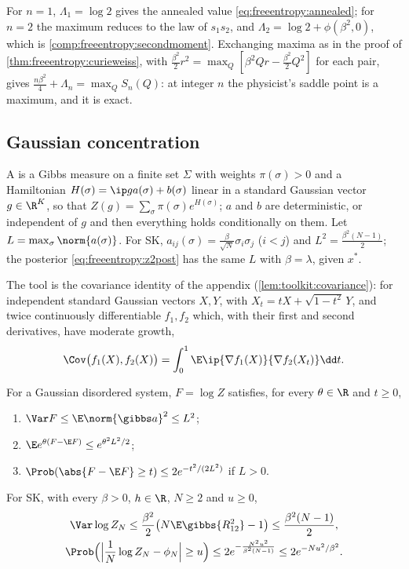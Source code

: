 \begin{refsection}
For $n=1$, $\Lambda_1=\log2$ gives the annealed value \eqref{eq:freeentropy:annealed}; for $n=2$ the maximum reduces to the law of $s_1s_2$, and $\Lambda_2=\log2+\phi(\beta^2,0)$, which is \cref{comp:freeentropy:secondmoment}. Exchanging maxima as in the proof of \cref{thm:freeentropy:curieweiss}, with $\frac{\beta^2}2r^2=\max_Q[\beta^2Qr-\frac{\beta^2}2Q^2]$ for each pair, gives $\frac{n\beta^2}4+\Lambda_n=\max_QS_n(Q)$: at integer $n$ the physicist's saddle point is a maximum, and it is exact.

\subsection{Gaussian concentration}\label{sec:freeentropy:concentration}

A  is a Gibbs measure on a finite set $\Sigma$ with weights $\pi(\sigma)>0$ and a Hamiltonian $H(\sigma)=\ip g{a(\sigma)}+b(\sigma)$ linear in a standard Gaussian vector $g\in\R^K$, so that $Z(g)=\sum_\sigma\pi(\sigma)e^{H(\sigma)}$; $a$ and $b$ are deterministic, or independent of $g$ and then everything holds conditionally on them. Let $L=\max_\sigma\norm{a(\sigma)}$. For SK, $a_{ij}(\sigma)=\frac\beta{\sqrt N}\sigma_i\sigma_j$ ($i<j$) and $L^2=\frac{\beta^2(N-1)}2$; the posterior \eqref{eq:freeentropy:z2post} has the same $L$ with $\beta=\lambda$, given $x^*$.

The tool is the covariance identity of the appendix (\cref{lem:toolkit:covariance}): for independent standard Gaussian vectors $X,Y$, with $X_t=tX+\sqrt{1-t^2}\,Y$, and twice continuously differentiable $f_1,f_2$ which, with their first and second derivatives, have moderate growth,
\begin{equation}\label{eq:freeentropy:covariance}
\Cov\bigl(f_1(X),f_2(X)\bigr)=\int_0^1\E\ip{\nabla f_1(X)}{\nabla f_2(X_t)}\dd t.
\end{equation}

\begin{theorem}\label{thm:freeentropy:concentration}
For a Gaussian disordered system, $F=\log Z$ satisfies, for every $\theta\in\R$ and $t\ge0$,
\begin{enumerate}
\item $\Var F\le\E\norm{\gibbs a}^2\le L^2$;
\item $\E e^{\theta(F-\E F)}\le e^{\theta^2L^2/2}$;
\item $\Prob(\abs{F-\E F}\ge t)\le2e^{-t^2/(2L^2)}$ if $L>0$.
\end{enumerate}
For SK, with every $\beta>0$, $h\in\R$, $N\ge2$ and $u\ge0$,
\begin{gather}
\Var\log Z_N\le\frac{\beta^2}2\bigl(N\E\gibbs{R_{12}^2}-1\bigr)\le\frac{\beta^2(N-1)}2,\notag\\
\Prob\Bigl(\Bigl|\frac1N\log Z_N-\phi_N\Bigr|\ge u\Bigr)\le2e^{-\frac{N^2u^2}{\beta^2(N-1)}}\le2e^{-Nu^2/\beta^2}.\label{eq:freeentropy:sktail}
\end{gather}
\end{theorem}


\end{refsection}
